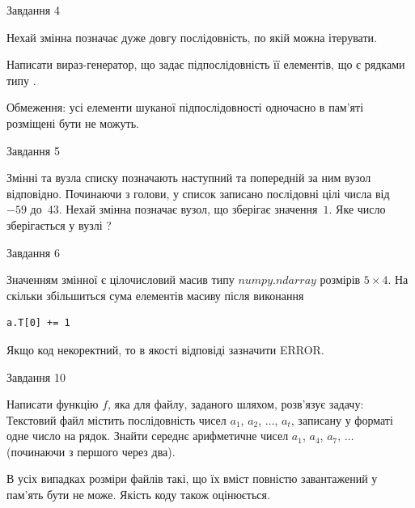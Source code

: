 \documentclass[12pt, ukrainian]{article}
\begin{document}
{               
{\begin{center}Завдання {4}\end{center}}
\vspace{-4mm}
Нехай змінна  позначає дуже довгу послідовність, по якій можна ітерувати.

Написати вираз-генератор, що задає підпослідовність її елементів, що є рядками типу .

Обмеження: усі елементи шуканої підпослідовності одночасно в пам'яті розміщені бути не можуть.\par

\vspace{10mm}
               
{\begin{center}Завдання {5}\end{center}}
\vspace{-4mm}
Змінні  та  вузла списку позначають наступний та попередній за ним вузол відповідно. Починаючи з голови, у список записано послідовні цілі числа від~$-59$ до~$43$. Нехай змінна  позначає вузол, що зберігає значення~$1$.
Яке число зберігається у вузлі  ?\par

               
{\begin{center}Завдання {6}\end{center}}
\vspace{-4mm}
Значенням змінної  є цілочисловий масив типу $numpy.ndarray$ розмірів $5{\times}4$. На скільки збільшиться сума елементів масиву  після виконання
\begin{verbatim}
a.T[0] += 1
\end{verbatim}


Якщо код некоректний, то в якості відповіді зазначити ERROR.\par

               
{\begin{center}Завдання {10}\end{center}}
\vspace{-4mm}

Написати функцію $f$, яка для файлу, заданого шляхом, розв’язує задачу:\\ Текстовий файл містить послідовність чисел $a_1$, $a_2$, $\ldots$, $a_t$, записану у форматі одне число на рядок. Знайти середнє арифметичне чисел $a_1$, $a_4$, $a_7$, $\ldots$ (починаючи з першого через два).

В усіх випадках розміри файлів такі, що їх вміст повністю завантажений у пам'ять бути не може. Якість коду також оцінюється.



}
\end{document}
